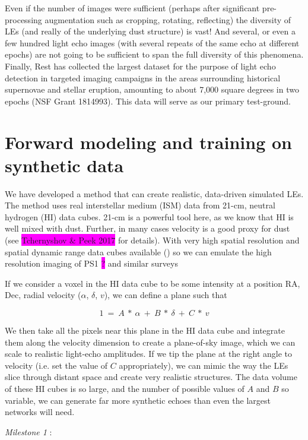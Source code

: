 \documentclass{proposalnsf}
\newcommand{\changeit}[1]{\colorbox{magenta}{#1}}
\begin{document}
Even if the number of images were sufficient (perhaps after significant pre-processing augmentation such as cropping, rotating, reflecting) the diversity of LEs (and really of the underlying dust structure) is vast! And several, or even a few hundred light echo images (with several repeats of the same echo at different epochs) are not going to be sufficient to span the full diversity of this phenomena.  
Finally, Rest has collected the largest dataset for the purpose of light echo detection in targeted imaging campaigns in the areas surrounding historical supernovae and stellar eruption, amounting to about 7,000 square degrees in two epochs (NSF Grant 1814993). This data will serve as our primary test-ground.


\section{Forward modeling and training on synthetic data}\label{sec:fwm}


We have developed a method that can create realistic, data-driven simulated LEs.  The method uses real interstellar medium (ISM) data from 21-cm, neutral hydrogen (HI) data cubes.  21-cm is a powerful tool here, as we know that HI is well mixed with dust.  Further, in many cases velocity is a good proxy for dust (see \changeit{Tchernyshov \& Peek 2017} for details).  With very high spatial resolution and spatial dynamic range data cubes available () so we can emulate the high resolution imaging of PS1 \changeit{?} and similar surveys

If we consider a voxel in the HI data cube to be some intensity at a position RA, Dec, radial velocity ($\alpha$, $\delta$, $v$), we can define a plane such that 

$$1~=~A~*~\alpha~+~B~*~\delta~+~C~*~v$$

We then take all the pixels near this plane in the HI data cube and integrate them along the velocity dimension to create a plane-of-sky image, which we can scale to realistic light-echo amplitudes.  If we tip the plane at the right angle to velocity (i.e.  set the value of $C$ appropriately), we can mimic the way the LEs slice through distant space and create very realistic structures.  The data volume of these HI cubes is so large, and the number of possible values of $A$ and $B$ so variable, we can generate far more synthetic echoes than even the largest networks will need.  

\emph{Milestone 1} :
\end{document}
